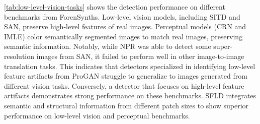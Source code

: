 \cref{tab:low-level-vision-tasks} shows the detection performance on different benchmarks from ForenSynths\cite{wang2020cnn}.
Low-level vision models, including SITD and SAN, preserve high-level features of real images.
Perceptual models (CRN and IMLE) color semantically segmented images to match real images, preserving semantic information.
Notably, while NPR was able to detect some super-resolution images from SAN, it failed to perform well in other image-to-image translation tasks. This indicates that detectors specialized in identifying low-level feature artifacts from ProGAN struggle to generalize to images generated from different vision tasks. 
Conversely, a detector that focuses on high-level feature artifacts demonstrates strong performance on these benchmarks.
SFLD integrates semantic and structural information from different patch sizes to show superior performance on low-level vision and perceptual benchmarks.
